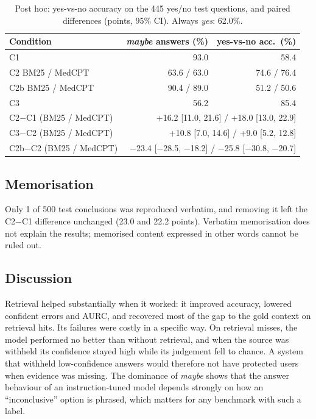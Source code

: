 \documentclass[conference]{IEEEtran}
\begin{document}
\begin{table}[t]
\centering
\caption{Post hoc: yes-vs-no accuracy on the 445 yes/no test questions, and
paired differences (points, 95\% CI). Always \emph{yes}: 62.0\%.}
\label{tab:posthoc}
\setlength{\tabcolsep}{4pt}
\begin{tabular}{@{}lrr@{}}
\toprule
Condition & \emph{maybe} answers (\%) & yes-vs-no acc.\ (\%) \\
\midrule
C1 & 93.0 & 58.4 \\
C2 BM25 / MedCPT & 63.6 / 63.0 & 74.6 / 76.4 \\
C2b BM25 / MedCPT & 90.4 / 89.0 & 51.2 / 50.6 \\
C3 & 56.2 & 85.4 \\
\midrule
C2$-$C1 (BM25 / MedCPT) & \multicolumn{2}{r}{+16.2 [11.0, 21.6] / +18.0 [13.0, 22.9]} \\
C3$-$C2 (BM25 / MedCPT) & \multicolumn{2}{r}{+10.8 [7.0, 14.6] / +9.0 [5.2, 12.8]} \\
C2b$-$C2 (BM25 / MedCPT) & \multicolumn{2}{r}{$-$23.4 [$-$28.5, $-$18.2] / $-$25.8 [$-$30.8, $-$20.7]} \\
\bottomrule
\end{tabular}
\end{table}

\subsection{Memorisation}
Only 1 of 500 test conclusions was reproduced verbatim, and removing it left the
C2$-$C1 difference unchanged (23.0 and 22.2 points). Verbatim memorisation does
not explain the results; memorised content expressed in other words cannot be
ruled out.

\subsection{Discussion}
Retrieval helped substantially when it worked: it improved accuracy, lowered
confident errors and AURC, and recovered most of the gap to the gold context on
retrieval hits. Its failures were costly in a specific way. On retrieval misses,
the model performed no better than without retrieval, and when the source was
withheld its confidence stayed high while its judgement fell to chance. A system
that withheld low-confidence answers would therefore not have protected users
when evidence was missing. The dominance of \emph{maybe} shows that the answer
behaviour of an instruction-tuned model depends strongly on how an
``inconclusive'' option is phrased, which matters for any benchmark with such a
label.
\end{document}

